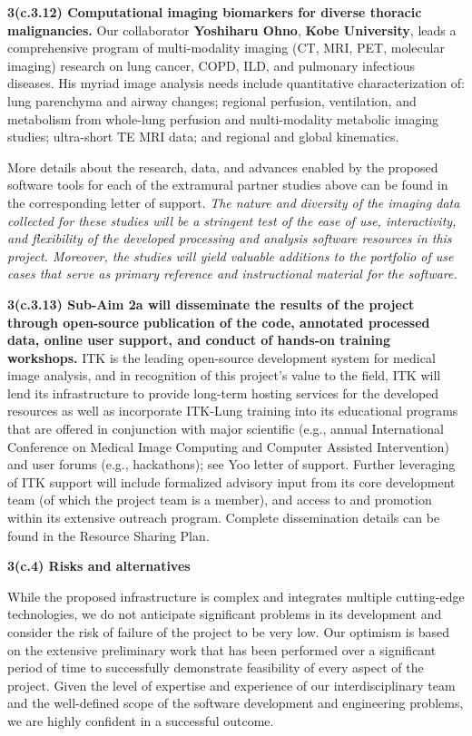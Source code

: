 \documentclass[11pt,]{article}
\begin{document}
\textbf{3(c.3.12) Computational imaging biomarkers for diverse thoracic
malignancies.} Our collaborator \textbf{Yoshiharu Ohno}, \textbf{Kobe
University}, leads a comprehensive program of multi-modality imaging
(CT, MRI, PET, molecular imaging) research on lung cancer, COPD, ILD,
and pulmonary infectious diseases. His myriad image analysis needs
include quantitative characterization of: lung parenchyma and airway
changes; regional perfusion, ventilation, and metabolism from whole-lung
perfusion and multi-modality metabolic imaging studies; ultra-short TE
MRI data; and regional and global kinematics.

More details about the research, data, and advances enabled by the
proposed software tools for each of the extramural partner studies above
can be found in the corresponding letter of support. \emph{The nature
and diversity of the imaging data collected for these studies will be a
stringent test of the ease of use, interactivity, and flexibility of the
developed processing and analysis software resources in this project.
Moreover, the studies will yield valuable additions to the portfolio of
use cases that serve as primary reference and instructional material for
the software.}

\textbf{3(c.3.13) Sub-Aim 2a will disseminate the results of the project
through open-source publication of the code, annotated processed data,
online user support, and conduct of hands-on training workshops.} ITK is
the leading open-source development system for medical image analysis,
and in recognition of this project's value to the field, ITK will lend
its infrastructure to provide long-term hosting services for the
developed resources as well as incorporate ITK-Lung training into its
educational programs that are offered in conjunction with major
scientific (e.g., annual International Conference on Medical Image
Computing and Computer Assisted Intervention) and user forums (e.g.,
hackathons); see Yoo letter of support. Further leveraging of ITK
support will include formalized advisory input from its core development
team (of which the project team is a member), and access to and
promotion within its extensive outreach program. Complete dissemination
details can be found in the Resource Sharing Plan.

\textbf{3(c.4) Risks and alternatives}

While the proposed infrastructure is complex and integrates multiple
cutting-edge technologies, we do not anticipate significant problems in
its development and consider the risk of failure of the project to be
very low. Our optimism is based on the extensive preliminary work that
has been performed over a significant period of time to successfully
demonstrate feasibility of every aspect of the project. Given the level
of expertise and experience of our interdisciplinary team and the
well-defined scope of the software development and engineering problems,
we are highly confident in a successful outcome.
\end{document}
